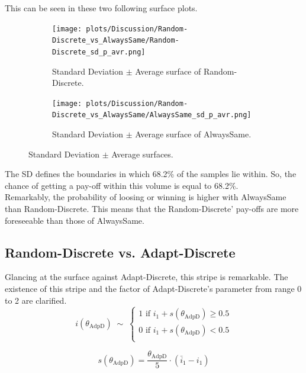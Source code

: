 \documentclass{article}
\newcommand{\round}[1]{\ensuremath{\lfloor#1\rceil}}
\begin{document}
	This can be seen in these two following surface plots.
	\begin{figure}[h]
		\centering
		\begin{subfigure}[t]{0.45\textwidth}
			\centering
				\texttt{[image: plots/Discussion/Random-Discrete\_vs\_AlwaysSame/Random-Discrete\_sd\_p\_avr.png]}
			\caption{Standard Deviation $\pm$ Average surface of Random-Discrete.}
			\label{fig:RNDD_sd_pm_avr}
		\end{subfigure}\hfill
		\begin{subfigure}[t]{0.45\textwidth}
			\centering
				\texttt{[image: plots/Discussion/Random-Discrete\_vs\_AlwaysSame/AlwaysSame\_sd\_p\_avr.png]}
			\caption{Standard Deviation $\pm$ Average surface of AlwaysSame.}
			\label{fig:ALWS_sd_pm_avr}
		\end{subfigure}
		\caption{Standard Deviation $\pm$ Average surfaces.}
		\label{fig:Standard Deviation average.}
	\end{figure}

	The SD defines the boundaries in which 68.2\% of the samples lie within.
	So, the chance of getting a pay-off within this volume is equal to 68.2\%.\\
	Remarkably, the probability of loosing or winning is higher with AlwaysSame than Random-Discrete.
	This means that the Random-Discrete' pay-offs are more foreseeable than those of AlwaysSame.

\subsection{Random-Discrete vs. Adapt-Discrete} \label{sec:RndD_vs_AdpD}
		Glancing at the surface against Adapt-Discrete, this stripe is remarkable.
		The existence of this stripe and the factor of Adapt-Discrete's parameter from range 0 to 2 are clarified.\\
	\begin{equation}
		i(\theta_{\mathrm{AdpD}}) \;\sim\;
		\begin{cases}
			1 \text{ if } i_1 + s(\theta_{\mathrm{AdpD}}) \ge 0.5\\
			0 \text{ if } i_1 + s(\theta_{\mathrm{AdpD}}) < 0.5\\
		\end{cases}
		\label{eq:AdpD_rounded}
	\end{equation}

	\begin{equation}
		s(\theta_{\mathrm{AdpD}}) = \frac{\theta_{\mathrm{AdpD}}}{5} \cdot (\bar i_1 - i_1)
		\label{eq:AdpD_eq_s}
	\end{equation}
\end{document}
